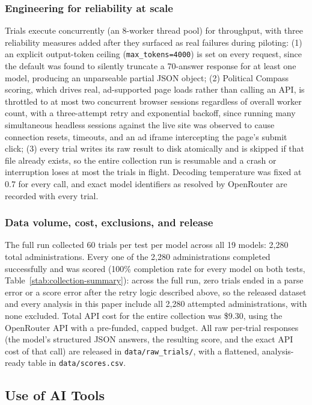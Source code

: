 \documentclass[11pt]{article}
\begin{document}
\subsubsection{Engineering for reliability at scale}
Trials execute concurrently (an 8-worker thread pool) for throughput, with
three reliability measures added after they surfaced as real failures during
piloting: (1) an explicit output-token ceiling (\texttt{max\_tokens=4000}) is
set on every request, since the default was found to silently truncate a
70-answer response for at least one model, producing an unparseable partial
JSON object; (2) Political Compass scoring, which drives real, ad-supported
page loads rather than calling an API, is throttled to at most two concurrent
browser sessions regardless of overall worker count, with a three-attempt
retry and exponential backoff, since running many simultaneous headless
sessions against the live site was observed to cause connection resets,
timeouts, and an ad iframe intercepting the page's submit click; (3) every
trial writes its raw result to disk atomically and is skipped if that file
already exists, so the entire collection run is resumable and a crash or
interruption loses at most the trials in flight. Decoding temperature was
fixed at 0.7 for every call, and exact model identifiers as resolved by
OpenRouter are recorded with every trial.

\subsubsection{Data volume, cost, exclusions, and release}
The full run collected 60 trials per test per model across all 19 models:
2{,}280 total administrations. Every one of the 2{,}280 administrations
completed successfully and was scored (100\% completion rate for every model
on both tests, Table~\ref{stab:collection-summary}): across the full run,
zero trials ended in a parse error or a score error after the retry logic
described above, so the released dataset and every analysis in this paper
include all 2{,}280 attempted administrations, with none excluded. Total API
cost for the entire collection was \$9.30, using the OpenRouter API with a
pre-funded, capped budget. All raw per-trial responses (the model's
structured JSON answers, the resulting score, and the exact API cost of that
call) are released in \texttt{data/raw\_trials/}, with a flattened,
analysis-ready table in \texttt{data/scores.csv}.

\subsection{Use of AI Tools}
\label{si:ai-use}
\end{document}
